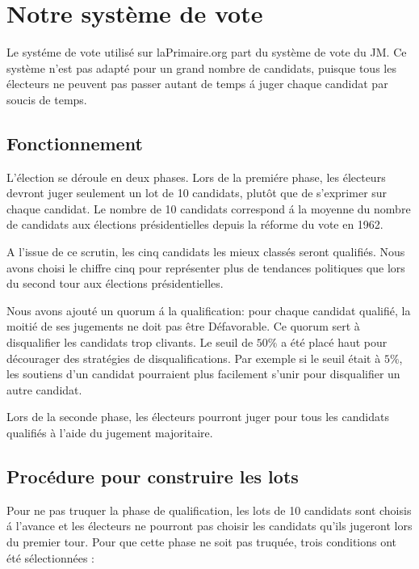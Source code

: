 \documentclass[conference]{IEEEtran}
\begin{document}




\section{Notre syst\`eme de vote}
\label{sec:laprimaire}

Le syst\'eme de vote utilis\'e sur laPrimaire.org part du syst\`eme de vote du JM. Ce syst\`eme n'est pas adapt\'e pour un grand nombre de candidats, puisque tous les \'electeurs ne peuvent pas passer autant de temps \'a juger chaque candidat par soucis de temps.

\subsection{Fonctionnement}
L'\'election se d\'eroule en deux phases. Lors de la premi\'ere phase, les \'electeurs devront juger seulement un lot de 10 candidats, plut\^ot que de s'exprimer sur chaque candidat. Le nombre de 10 candidats correspond \'a la moyenne du nombre de candidats aux \'elections pr\'esidentielles depuis la r\'eforme du vote en 1962.

A l'issue de ce scrutin, les cinq candidats les mieux class\'es seront qualifi\'es. Nous avons choisi le chiffre cinq pour repr\'esenter plus de tendances politiques que lors du second tour aux \'elections pr\'esidentielles. 

Nous avons ajout\'e un quorum \'a la qualification: pour chaque candidat qualifi\'e, la moiti\'e de ses jugements ne doit pas \^etre D\'efavorable. Ce quorum sert \`a disqualifier les candidats trop clivants. Le seuil de $50\%$ a \'et\'e plac\'e haut pour d\'ecourager des strat\'egies de disqualifications. Par exemple si le seuil \'etait \`a $5\%$, les soutiens d'un candidat pourraient plus facilement s'unir pour disqualifier un autre candidat.

Lors de la seconde phase, les \'electeurs pourront juger pour tous les candidats qualifi\'es \`a l'aide du jugement majoritaire.


\subsection{Proc\'edure pour construire les lots}

Pour ne pas truquer la phase de qualification, les lots de 10 candidats sont choisis \'a l'avance et les \'electeurs ne pourront pas choisir les candidats qu'ils jugeront lors du premier tour. Pour que cette phase ne soit pas truqu\'ee, trois conditions ont \'et\'e s\'electionn\'ees :
\end{document}
